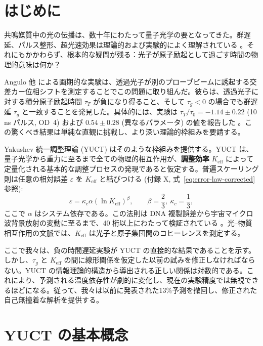 \documentclass[12pt,a4paper]{article}
\newcommand{\Keff}{K_{\mathrm{eff}}}
\newcommand{\kappac}{\kappa_c}
\newcommand{\eps}{\varepsilon}
\newcommand{\betac}{\beta}
\begin{document}
	\tableofcontents
	\newpage
	
	\section{はじめに}
	
	共鳴媒質中の光の伝播は、数十年にわたって量子光学の要となってきた。群遅延、パルス整形、超光速効果は理論的および実験的によく理解されている \cite{Brillouin1960, Milonni2004}。それにもかかわらず、根本的な疑問が残る：光子が原子励起として過ごす時間の物理的意味は何か？
	
	Angulo 他 \cite{Angulo2024} による画期的な実験は、透過光子が別のプローブビームに誘起する交差カー位相シフトを測定することでこの問題に取り組んだ。彼らは、透過光子に対する積分原子励起時間 \(\tau_T\) が負になり得ること、そして \(\tau_g < 0\) の場合でも群遅延 \(\tau_g\) と一致することを発見した。具体的には、実験は \(\tau_T/\tau_0 = -1.14 \pm 0.22\) (10 ns パルス, OD~4) および \(0.54 \pm 0.28\) (異なるパラメータ) の値を報告した \cite{Angulo2024, Nixon2024}。この驚くべき結果は単純な直観に挑戦し、より深い理論的枠組みを要請する。
	
	Yakushev 統一調整理論 (YUCT) \cite{Yakushev2026a} はそのような枠組みを提供する。YUCT は、量子光学から重力に至るまで全ての物理的相互作用が、\textbf{調整効率} \(\Keff\) によって定量化される基本的な調整プロセスの発現であると仮定する。普遍スケーリング則は任意の相対誤差 \(\eps\) を \(\Keff\) と結びつける (付録 X, 式~\ref{eq:error-law-corrected} 参照):
	\begin{equation}
		\eps = \kappac \alpha (\ln\Keff)^{\betac}, \qquad \betac = \frac{2}{3},\ \kappac = \frac{1}{3},
		\label{eq:scaling}
	\end{equation}
	ここで \(\alpha\) はシステム依存である。この法則は DNA 複製誤差から宇宙マイクロ波背景放射の変動に至るまで、40 桁以上にわたって検証されている \cite{Yakushev2026c}。光–物質相互作用の文脈では、\(\Keff\) は光子と原子集団間のコヒーレンスを測定する。
	
	ここで我々は、負の時間遅延実験が YUCT の直接的な結果であることを示す。しかし、\(\tau_g\) と \(\Keff\) の間に線形関係を仮定した以前の試みを修正しなければならない。YUCT の情報理論的構造から導出される正しい関係は対数的である。これにより、予測される温度依存性が劇的に変化し、現在の実験精度では無視できるほどになる。従って、我々は以前に発表された13\%予測を撤回し、修正された自己無撞着な解析を提供する。
	
	\section{YUCT の基本概念}
	
\end{document}
